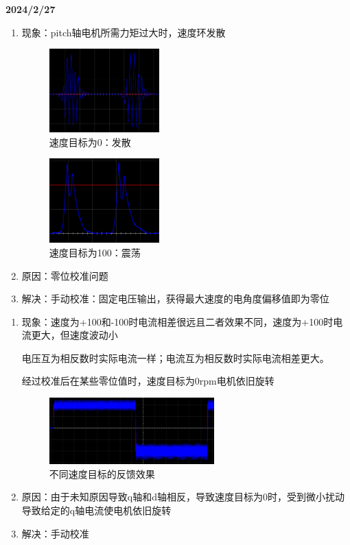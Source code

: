 \documentclass[main.tex]{subfiles}
\begin{document}
\textbf{2024/2/27}
\begin{enumerate}
    \item 现象：pitch轴电机所需力矩过大时，速度环发散
    \begin{figure}[H]
        \centering
        \includegraphics[width=0.4\textwidth]{img/img_1.4.1.png}
        \caption{速度目标为0：发散}
        \label{goal-0}
    \end{figure}
    \begin{figure}[H]
        \centering
        \includegraphics[width=0.4\textwidth]{img/img_1.4.2.png}
        \caption{速度目标为100：震荡}
        \label{goal-100}
    \end{figure}
    \item 原因：零位校准问题
    \item 解决：手动校准：固定电压输出，获得最大速度的电角度偏移值即为零位\\
\end{enumerate}

\begin{enumerate}
    \item 现象：速度为+100和-100时电流相差很远且二者效果不同，速度为+100时电流更大，但速度波动小

          电压互为相反数时实际电流一样；电流互为相反数时实际电流相差更大。

          经过校准后在某些零位值时，速度目标为0rpm电机依旧旋转
    \begin{figure}[H]
        \centering
        \includegraphics[width=0.6\textwidth]{img/img_1.4.3.png}
        \caption{不同速度目标的反馈效果}
        \label{speed equal to 100 and -100}
    \end{figure}
    \item 原因：由于未知原因导致q轴和d轴相反，导致速度目标为0时，受到微小扰动导致给定的q轴电流使电机依旧旋转
    \item 解决：手动校准\\
\end{enumerate}
\end{document}
